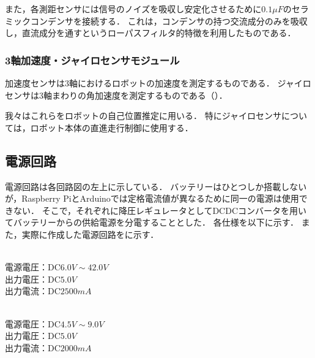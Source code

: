 \documentclass[11pt,a4]{jsarticle}
\begin{document}
      また，各測距センサには信号のノイズを吸収し安定化させるために$0.1 \unit{\mu F}$のセラミックコンデンサを接続する．
      これは，コンデンサの持つ交流成分のみを吸収し，直流成分を通すというローパスフィルタ的特徴を利用したものである．


    \subsubsection{3軸加速度・ジャイロセンサモジュール}
      加速度センサは3軸におけるロボットの加速度を測定するものである．
      ジャイロセンサは3軸まわりの角加速度を測定するものである（）．

      我々はこれらをロボットの自己位置推定に用いる．
      特にジャイロセンサについては，ロボット本体の直進走行制御に使用する．


  \subsection{電源回路}
    電源回路は各回路図の左上に示している．
    バッテリーはひとつしか搭載しないが，Raspberry PiとArduinoでは定格電流値が異なるために同一の電源は使用できない．
    そこで，それぞれに降圧レギュレータとしてDCDCコンバータを用いてバッテリーからの供給電源を分電することとした．
    各仕様を以下に示す．
    また，実際に作成した電源回路をに示す．

    \begin{description}
      \setlength{\leftskip}{3mm}
      \item[LR8697] \mbox{} \\
        電源電圧：$\mathrm{DC}6.0\unit{V} \sim 42.0\unit{V}$ \\
        出力電圧：$\mathrm{DC}5.0\unit{V}$ \\
        出力電流：$\mathrm{DC}2500\unit{mA}$ \\
    \end{description}

    \begin{description}
      \setlength{\leftskip}{3mm}
      \item[BTD05-05S200D] \mbox{} \\
        電源電圧：$\mathrm{DC}4.5\unit{V} \sim 9.0\unit{V}$ \\
        出力電圧：$\mathrm{DC}5.0\unit{V}$ \\
        出力電流：$\mathrm{DC}2000\unit{mA}$ \\
    \end{description}
\end{document}
